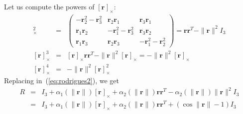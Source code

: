 \documentclass {article}
\newcommand\rot{\mathbf{r}}
\newcommand\rcross[1]{[\rot_{#1}]_{\times}}
\newcommand\normr{\|\rot\|}
\begin{document}
Let us compute the powers of $\rcross{}$:
\begin{eqnarray}
\rcross{}^2 &=& \left(\begin{array}{ccc}
-\rot_2^2-\rot_3^2 & \rot_2\rot_1 & \rot_3\rot_1 \\
\rot_1\rot_2 & -\rot_1^2-\rot_3^2 & \rot_3\rot_2 \\
\rot_1\rot_3 & \rot_2\rot_3 & -\rot_1^2-\rot_2^2
\end{array}\right) =
\rot\rot^T - \normr^2 I_3\\
\label{eq:rcross2}
\rcross{}^3 &=& \rcross{}\rot\rot^T - \normr^2 \rcross{} = - \normr^2 \rcross{}\\
\label{eq:rcross3}
\rcross{}^4 &=& - \normr^2 \rcross{}^2
\end{eqnarray}
Replacing in~(\ref{eq:rodrigues2}), we get
\begin{eqnarray}
R &=& I_3 + \alpha_1 (\normr) \rcross{} + \alpha_2 (\normr) \rot\rot^T - \alpha_2 (\normr) \normr^2 I_3\\
\label{eq:rodrigues3}
&=&I_3 + \alpha_1 (\normr) \rcross{} + \alpha_2 (\normr) \rot\rot^T + (\cos\normr-1) I_3
\end{eqnarray}
\end{document}
